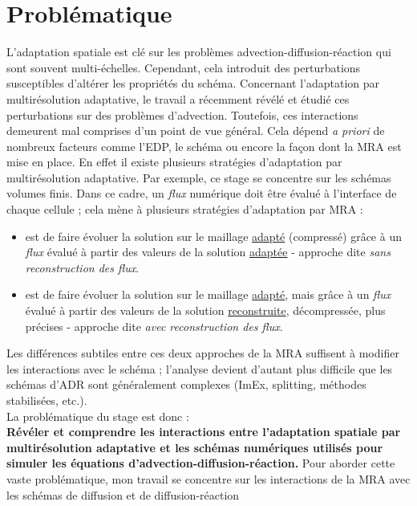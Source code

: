    \section{Problématique}
    \label{par:problematique}
        L'adaptation spatiale est clé sur les problèmes advection-diffusion-réaction qui sont souvent multi-échelles.
        Cependant, cela introduit des perturbations susceptibles d'altérer les propriétés du schéma.
        Concernant l'adaptation par multirésolution adaptative, le travail \cite{belloti_et_al_2025} a récemment révélé et étudié 
        ces perturbations sur des problèmes d'advection. 
        Toutefois, ces interactions demeurent mal comprises d'un point de vue général.
        Cela dépend \emph{a priori} de nombreux facteurs comme l'EDP, le schéma ou encore la façon dont la MRA est mise en place. 
        En effet il existe plusieurs stratégies d'adaptation par multirésolution adaptative. Par exemple, ce stage se concentre sur les schémas volumes finis.
        Dans ce cadre, un \emph{flux} numérique doit être évalué à l'interface de chaque cellule ; cela mène à plusieurs stratégies d'adaptation par MRA : 
        \begin{itemize}
            \item {} est de faire évoluer la solution sur le maillage \underline{adapté} (compressé) grâce à un \emph{flux} évalué à partir des valeurs de la solution \underline{adaptée} - approche dite \emph{sans reconstruction des flux}.
            \item {} est de faire évoluer la solution sur le maillage \underline{adapté}, mais grâce à un \emph{flux} évalué à partir des valeurs de la solution \underline{reconstruite}, décompressée, plus précises - approche dite \emph{avec reconstruction des flux}.
        \end{itemize}
        Les différences subtiles entre ces deux approches de la MRA suffisent à modifier les interactions avec le schéma ;
        l'analyse devient d'autant plus difficile que les schémas d'ADR sont généralement complexes (ImEx, splitting, méthodes stabilisées, etc.).\\
    La problématique du stage est donc : \\\textbf{Révéler et comprendre les interactions entre l'adaptation spatiale par multirésolution adaptative et les schémas numériques 
    utilisés pour simuler les équations d'advection-diffusion-réaction.}
    Pour aborder cette vaste problématique, mon travail se concentre sur les interactions de la MRA avec les schémas de diffusion et de diffusion-réaction
